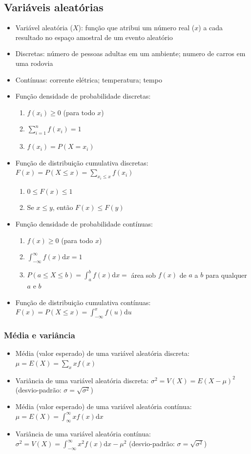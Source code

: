 \subsection{Variáveis aleatórias}
\begin{itemize}
	\item Variável aleatória ($X$): função que atribui um número real ($x$) a cada resultado no espaço amostral de um evento aleatório
	\item Discretas: número de pessoas adultas em um ambiente; numero de carros em uma rodovia
	\item Contínuas: corrente elétrica; temperatura; tempo
	\item Função densidade de probabilidade discretas:
	\begin{enumerate}
		\item $f(x_i) \geq 0$ (para todo $x$)
		\item $\sum_{i=1}^n f(x_i)=1$
		\item $f(x_i)=P(X=x_i)$
	\end{enumerate}
	\item Função de distribuição cumulativa discretas: $F(x)=P(X\leq x)=\sum_{x_i\leq x}f(x_i)$
	\begin{enumerate}
		\item $0\leq F(x)\leq 1$
		\item Se $x\leq y$, então $F(x)\leq F(y)$
	\end{enumerate}
	\item Função densidade de probabilidade contínuas:
	\begin{enumerate}
		\item $f(x) \geq 0$ (para todo $x$)
		\item $\int_{-\infty}^\infty f(x)\mathrm{d}x=1$
		\item $P(a\leq X\leq b)=\int_a^b f(x)\mathrm{d}x=$ área sob $f(x)$ de $a$ a $b$ para qualquer $a$ e $b$
	\end{enumerate}
	\item Função de distribuição cumulativa contínuas: $F(x)=P(X\leq x)=\int_{-\infty}^{x}f(u)\mathrm{d}u$
\end{itemize}
\subsubsection{Média e variância}
\begin{itemize}
	\item Média (valor esperado) de uma variável aleatória discreta: $\mu=E(X)=\sum_{x}xf(x)$
	\item Variância de uma variável aleatória discreta: $\sigma^2=V(X)=E(X-\mu)^2$ (desvio-padrão: $\sigma=\sqrt{\sigma^2}$)
	\item Média (valor esperado) de uma variável aleatória contínua: $\mu=E(X)=\int_{\infty}^{\infty}xf(x)\mathrm{d}x$
	\item Variância de uma variável aleatória contínua: $\sigma^2=V(X)=\int_{-\infty}^{\infty}x^2f(x)\mathrm{d}x-\mu^2$ (desvio-padrão: $\sigma=\sqrt{\sigma^2}$)
\end{itemize}

